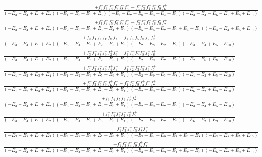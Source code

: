 \documentclass{article}
\begin{document}
\[\begin{array}{rcl}
\frac{+f_{1}^{-}f_{3}^{-}f_{4}^{-}f_{7}^{-}f_{8}^{-}f_{6}^{+}-f_{1}^{-}f_{3}^{-}f_{4}^{-}f_{8}^{-}f_{9}^{-}f_{6}^{+}}{(-E_{3}-E_{4}+E_{1}+E_{2})(-E_{1}-E_{8}+E_{5}+E_{6})(-E_{1}-E_{7}-E_{8}+E_{3}+E_{4}+E_{9})(-E_{3}-E_{4}-E_{6}+E_{1}+E_{8}+E_{10})}\\
\frac{+f_{3}^{-}f_{4}^{-}f_{5}^{-}f_{6}^{-}f_{7}^{-}f_{2}^{+}-f_{3}^{-}f_{4}^{-}f_{5}^{-}f_{6}^{-}f_{9}^{-}f_{2}^{+}}{(-E_{3}-E_{4}+E_{1}+E_{2})(-E_{2}-E_{5}-E_{6}+E_{3}+E_{4}+E_{8})(-E_{5}-E_{6}-E_{7}+E_{3}+E_{4}+E_{9})(-E_{3}-E_{4}+E_{5}+E_{10})}\\
\frac{+f_{3}^{-}f_{4}^{-}f_{5}^{-}f_{7}^{-}f_{8}^{-}f_{2}^{+}-f_{3}^{-}f_{4}^{-}f_{5}^{-}f_{8}^{-}f_{9}^{-}f_{2}^{+}}{(-E_{3}-E_{4}+E_{1}+E_{2})(-E_{3}-E_{4}-E_{8}+E_{2}+E_{5}+E_{6})(-E_{7}-E_{8}+E_{2}+E_{9})(-E_{3}-E_{4}+E_{5}+E_{10})}\\
\frac{+f_{3}^{-}f_{4}^{-}f_{8}^{-}f_{9}^{-}f_{2}^{+}f_{6}^{+}-f_{3}^{-}f_{4}^{-}f_{7}^{-}f_{8}^{-}f_{2}^{+}f_{6}^{+}}{(-E_{3}-E_{4}+E_{1}+E_{2})(-E_{3}-E_{4}-E_{8}+E_{2}+E_{5}+E_{6})(-E_{2}-E_{9}+E_{7}+E_{8})(-E_{2}-E_{6}+E_{8}+E_{10})}\\
\frac{+f_{1}^{-}f_{2}^{-}f_{5}^{-}f_{9}^{-}f_{4}^{+}f_{7}^{+}+f_{1}^{-}f_{2}^{-}f_{3}^{-}f_{5}^{-}f_{9}^{-}f_{7}^{+}}{(-E_{1}-E_{2}+E_{3}+E_{4})(-E_{1}-E_{2}-E_{9}+E_{5}+E_{6}+E_{7})(-E_{2}-E_{9}+E_{7}+E_{8})(-E_{1}-E_{2}+E_{5}+E_{10})}\\
\frac{+f_{1}^{-}f_{2}^{-}f_{3}^{-}f_{9}^{-}f_{6}^{+}f_{7}^{+}+f_{1}^{-}f_{2}^{-}f_{9}^{-}f_{4}^{+}f_{6}^{+}f_{7}^{+}}{(-E_{1}-E_{2}+E_{3}+E_{4})(-E_{1}-E_{2}-E_{9}+E_{5}+E_{6}+E_{7})(-E_{2}-E_{9}+E_{7}+E_{8})(-E_{6}-E_{7}+E_{9}+E_{10})}\\
\frac{+f_{3}^{-}f_{4}^{-}f_{5}^{-}f_{9}^{-}f_{2}^{+}f_{7}^{+}}{(-E_{3}-E_{4}+E_{1}+E_{2})(-E_{3}-E_{4}-E_{9}+E_{5}+E_{6}+E_{7})(-E_{2}-E_{9}+E_{7}+E_{8})(-E_{3}-E_{4}+E_{5}+E_{10})}\\
\frac{+f_{3}^{-}f_{4}^{-}f_{9}^{-}f_{2}^{+}f_{6}^{+}f_{7}^{+}}{(-E_{3}-E_{4}+E_{1}+E_{2})(-E_{3}-E_{4}-E_{9}+E_{5}+E_{6}+E_{7})(-E_{2}-E_{9}+E_{7}+E_{8})(-E_{6}-E_{7}+E_{9}+E_{10})}\\
\frac{+f_{1}^{-}f_{3}^{-}f_{4}^{-}f_{5}^{-}f_{9}^{-}f_{7}^{+}}{(-E_{3}-E_{4}+E_{1}+E_{2})(-E_{3}-E_{4}-E_{9}+E_{5}+E_{6}+E_{7})(-E_{3}-E_{4}-E_{9}+E_{1}+E_{7}+E_{8})(-E_{3}-E_{4}+E_{5}+E_{10})}\\
\frac{+f_{1}^{-}f_{3}^{-}f_{4}^{-}f_{9}^{-}f_{6}^{+}f_{7}^{+}}{(-E_{3}-E_{4}+E_{1}+E_{2})(-E_{3}-E_{4}-E_{9}+E_{5}+E_{6}+E_{7})(-E_{3}-E_{4}-E_{9}+E_{1}+E_{7}+E_{8})(-E_{6}-E_{7}+E_{9}+E_{10})}\\

\end{array}\]
\end{document}
